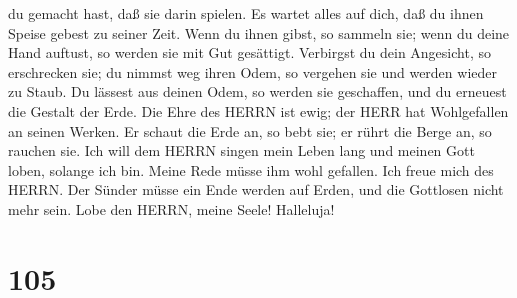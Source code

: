 du gemacht hast, daß sie darin spielen.  Es wartet alles
auf dich, daß du ihnen Speise gebest zu seiner Zeit.  Wenn
du ihnen gibst, so sammeln sie; wenn du deine Hand auftust, so werden
sie mit Gut gesättigt.  Verbirgst du dein Angesicht, so
erschrecken sie; du nimmst weg ihren Odem, so vergehen sie und werden
wieder zu Staub.  Du lässest aus deinen Odem, so werden sie
geschaffen, und du erneuest die Gestalt der Erde.  Die Ehre
des HERRN ist ewig; der HERR hat Wohlgefallen an seinen Werken.
 Er schaut die Erde an, so bebt sie; er rührt die Berge an,
so rauchen sie.  Ich will dem HERRN singen mein Leben lang
und meinen Gott loben, solange ich bin.  Meine Rede müsse
ihm wohl gefallen. Ich freue mich des HERRN.  Der Sünder
müsse ein Ende werden auf Erden, und die Gottlosen nicht mehr sein. Lobe
den HERRN, meine Seele! Halleluja!

\hypertarget{section-104}{%
\section{105}\label{section-104}}

